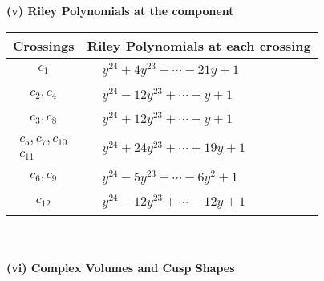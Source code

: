 \documentclass[1p]{elsarticle_modified}
\theoremstyle{definition}
\begin{document}
\newpage\renewcommand{\arraystretch}{1}
\flushleft \textbf{(v) Riley Polynomials at the component}\newline \\
\begin{tabular}{m{50pt}|m{274pt}}
Crossings & \hspace{64pt}Riley Polynomials at each crossing \\
\hline $$\begin{aligned}c_{1}\end{aligned}$$&$\begin{aligned}
&y^{24}+4 y^{23}+\cdots-21 y+1
\end{aligned}$\\
\hline $$\begin{aligned}c_{2},c_{4}\end{aligned}$$&$\begin{aligned}
&y^{24}-12 y^{23}+\cdots- y+1
\end{aligned}$\\
\hline $$\begin{aligned}c_{3},c_{8}\end{aligned}$$&$\begin{aligned}
&y^{24}+12 y^{23}+\cdots- y+1
\end{aligned}$\\
\hline $$\begin{aligned}c_{5},c_{7},c_{10}\\c_{11}\end{aligned}$$&$\begin{aligned}
&y^{24}+24 y^{23}+\cdots+19 y+1
\end{aligned}$\\
\hline $$\begin{aligned}c_{6},c_{9}\end{aligned}$$&$\begin{aligned}
&y^{24}-5 y^{23}+\cdots-6 y^2+1
\end{aligned}$\\
\hline $$\begin{aligned}c_{12}\end{aligned}$$&$\begin{aligned}
&y^{24}-12 y^{23}+\cdots-12 y+1
\end{aligned}$\\
\hline
\end{tabular}\\~\\
\newpage\flushleft \textbf{(vi) Complex Volumes and Cusp Shapes}
\end{document}
